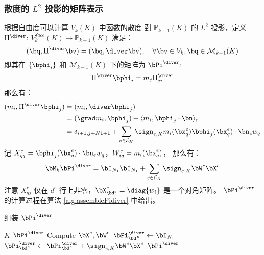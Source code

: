 \subsubsection{散度的 $L^2$ 投影的矩阵表示}
根据自由度可以计算
$V_k(K)$ 中函数的散度
到 $\mathbb{P}_{k-1}(K)$ 的 $L^2$ 投影，定义 $\Pi^{\diver}$: $V_k^{face}(K) \to
\mathbb{P}_{k-1}(K)$ 满足：
$$
(\bq, \Pi^{\diver} \bv) = (\bq, \diver\bv), \quad \forall \bv \in V_k, \bq \in
\mathcal{M}_{k-1}(K)
$$
即其在 $\{\bphi_i\}$ 和 $\mathcal{M}_{k-1}(K)$ 下的矩阵为 $\bPi^{\diver}$:
$$
\Pi^\diver \bphi_i = m_j \Pi^{\diver}_{ji}
$$
那么有：
$$
\begin{aligned}
    (m_i, \Pi^{\diver}\bphi_j) & = (m_i, \diver \bphi_j)\\
    & = (\grad m_i, \bphi_j) + \langle m_i, \bphi_j\cdot \bn \rangle_e\\ 
    & = \delta_{i+1, j+N1+1} + \sum_{e\in \mathcal{E}_K} \sign_{e, K}
    m_i(\bx_q^e)\bphi_j(\bx_q^e)\cdot \bn_e w_q
\end{aligned}
$$
记 $X^e_{qj} = \bphi_j(\bx_q^e)\cdot \bn_e w_q$，$W^e_{iq} = m_i(\bx_q^e)$，
那么有：
$$
\bM_k\bPi^{\diver} = \bI_{N_1}\bI_{N_1} + \sum_{e\in \mathcal{E}_K} \sign_{e, K}
\bW^e\bX^e
$$
注意 $X^e_{qj}$ 仅在 $d^e$ 行上非零，$\bX^e_{\bd^e} = \diag\{w_i\}$
是一个对角矩阵。
$\bPi^{\diver}$ 的计算过程在算法 \ref{alg:assemblePidiver} 中给出。
\begin{algorithm}
    \caption{组装 $\bPi^{\diver}$}\label{alg:assemblePidiver}
    \begin{algorithmic}[1]
    \Require $K$
    \Ensure $\bPi^{\diver}$
    \State Compute $\bX^e, \bW^e$
    \State $\bPi^{\diver}_{\bd^K} \gets \bI_{N_1}$
        \State $\bPi^{\diver}_{\bd^e} \gets \bPi^{\diver}_{\bd^e} + \sign_{e, K}\bW^e\bX^e$
    \EndFor
    \State \Return $\bPi^{\diver}$
\end{algorithmic}
\end{algorithm}

